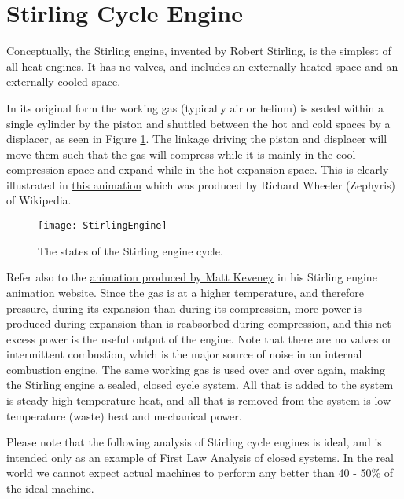 \section{Stirling Cycle Engine} \label{sec:ch3_stirling}
\label{sec:idealStirling}
Conceptually, the Stirling engine, invented by Robert Stirling, is the simplest of all heat engines. It has no valves, and includes an externally heated space and an externally cooled space. 

In its original form the working gas (typically air or helium) is sealed within a single cylinder by the piston and shuttled between the hot and cold spaces by a displacer, as seen in Figure \ref{fig:ch3_stirlingAll}. The linkage driving the piston and displacer will move them such that the gas will compress while it is mainly in the cool compression space and expand while in the hot expansion space. This is clearly illustrated in \href{https://en.wikipedia.org/wiki/Stirling_engine#/media/File:Stirling_Animation.gif}{this animation} which was produced by Richard Wheeler (Zephyris) of Wikipedia.

\begin{figure}[H]
\centering
\texttt{[image: StirlingEngine]}
\caption{The states of the Stirling engine cycle.}
\label{fig:ch3_stirlingAll}
\end{figure}
Refer also to the \href{http://animatedengines.com/stirling.html}{animation produced by Matt Keveney} in his Stirling engine animation website. Since the gas is at a higher temperature, and therefore pressure, during its expansion than during its compression, more power is produced during expansion than is reabsorbed during compression, and this net excess power is the useful output of the engine. Note that there are no valves or intermittent combustion, which is the major source of noise in an internal combustion engine. The same working gas is used over and over again, making the Stirling engine a sealed, closed cycle system. All that is added to the system is steady high temperature heat, and all that is removed from the system is low temperature (waste) heat and mechanical power.

Please note that the following analysis of Stirling cycle engines is ideal, and is intended only as an example of First Law Analysis of closed systems. In the real world we cannot expect actual machines to perform any better than 40 - 50\% of the ideal machine.

